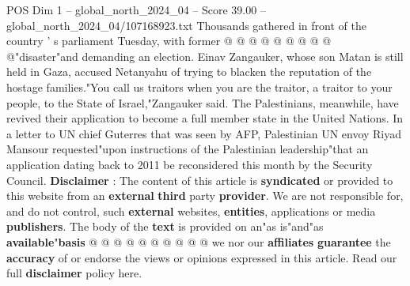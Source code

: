 \begin{textsample}{POS Dim 1 – global\_north\_2024\_04 – Score 39.00 – global\_north\_2024\_04/107168923.txt}
Thousands gathered in front of the country ' s parliament Tuesday, with former @ @ @ @ @ @ @ @ @ @"disaster"and demanding an election.
Einav Zangauker, whose son Matan is still held in Gaza, accused Netanyahu of trying to blacken the reputation of the hostage families."You call us traitors when you are the traitor, a traitor to your people, to the State of Israel,"Zangauker said.
The Palestinians, meanwhile, have revived their application to become a full member state in the United Nations.
In a letter to UN chief Guterres that was seen by AFP, Palestinian UN envoy Riyad Mansour requested"upon instructions of the Palestinian leadership"that an application dating back to 2011 be reconsidered this month by the Security Council. \textbf{Disclaimer} : The content of this article is \textbf{syndicated} or provided to this website from an \textbf{external} \textbf{third} party \textbf{provider}.
We are not responsible for, and do not control, such \textbf{external} websites, \textbf{entities}, applications or media \textbf{publishers}.
The body of the \textbf{text} is provided on an"as is"and"as \textbf{available}"\textbf{basis} @ @ @ @ @ @ @ @ @ @ we nor our \textbf{affiliates} \textbf{guarantee} the \textbf{accuracy} of or endorse the views or opinions expressed in this article.
Read our full \textbf{disclaimer} policy here.

\end{textsample}
